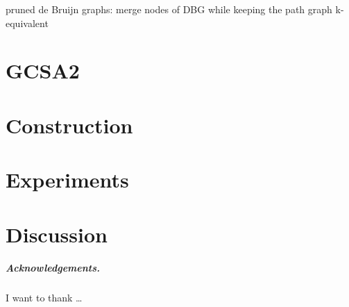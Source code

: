 \documentclass[a4paper,UKenglish]{lipics-v2016}
\begin{document}
pruned de Bruijn graphs: merge nodes of DBG while keeping the path graph k-equivalent


\section{GCSA2}


\section{Construction}


\section{Experiments}


\section{Discussion}


\subparagraph*{Acknowledgements.}

I want to thank \dots



\end{document}
